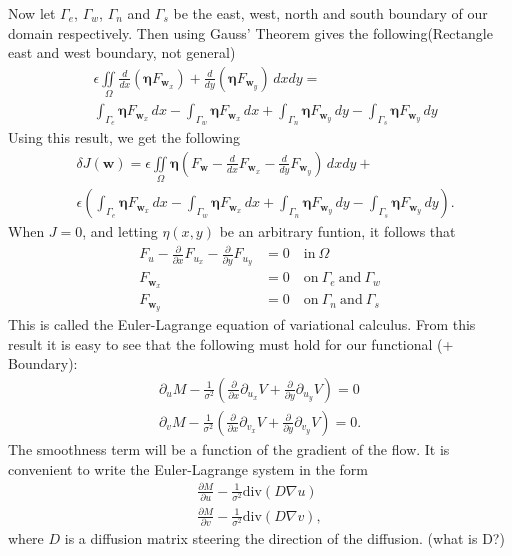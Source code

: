 \documentclass[10pt,a4paper]{article}
\begin{document}
Now let $\Gamma_{e}$, $\Gamma_{w}$, $\Gamma_{n}$ and $\Gamma_{s}$ be the east, west, north and south boundary of our domain respectively. Then using Gauss' Theorem gives the following(Rectangle east and west boundary, not general)
\begin{align*}
&\epsilon \iint \limits_{\Omega}  \frac{d}{d x} (\bm{\eta} F_{\textbf{w}_x}) + \frac{d }{d y} (\bm{\eta} F_{\textbf{w}_y}) \, dxdy = \\ &\int_{\Gamma_{e}} \bm{\eta} F_{\textbf{w}_x} \, dx - \int_{\Gamma_{w}} \bm{\eta} F_{\textbf{w}_x} \, dx + \int_{\Gamma_{n}} \bm{\eta} F_{\textbf{w}_y} \, dy - \int_{\Gamma_{s}} \bm{\eta} F_{\textbf{w}_y} \, dy
\end{align*}
Using this result, we get the following
\begin{align*}
&\delta J(\textbf{w}) = \epsilon \iint \limits_{\Omega} \bm{\eta} \left( F_\textbf{w} -  \frac{d}{d x} F_{\textbf{w}_x} - \frac{d }{d y} F_{\textbf{w}_y} \right) \, dxdy + \\ &\epsilon \left( \int_{\Gamma_{e}} \bm{\eta} F_{\textbf{w}_x} \, dx - \int_{\Gamma_{w}} \bm{\eta} F_{\textbf{w}_x} \, dx + \int_{\Gamma_{n}} \bm{\eta} F_{\textbf{w}_y} \, dy - \int_{\Gamma_{s}} \bm{\eta} F_{\textbf{w}_y} \, dy \right).
\end{align*}
When $J = 0$, and letting $\eta(x,y)$ be an arbitrary funtion, it follows that
\begin{align*}
F_u - \frac{\partial}{\partial x} F_{u_x} - \frac{\partial }{\partial y} F_{u_y} &= 0 \quad \text{in} \ \Omega \\
F_{\textbf{w}_x} &= 0 \quad \text{on} \ \Gamma_e \ \text{and} \ \Gamma_w \\
F_{\textbf{w}_y}& = 0 \quad \text{on} \ \Gamma_n \ \text{and} \ \Gamma_s
\end{align*}
This is called the Euler-Lagrange equation of variational calculus. From this result it is easy to see that the following must hold for our functional (+ Boundary):
\begin{equation}
\label{EL}
  \begin{aligned}
\partial_u M - \frac{1}{\sigma^2}\left( \frac{\partial}{\partial x} \partial_{u_x} V + \frac{\partial}{\partial y} \partial_{u_y} V \right) = 0 \\
\partial_v M- \frac{1}{\sigma^2} \left(\frac{\partial}{\partial x} \partial_{v_x} V + \frac{\partial}{\partial y} \partial_{v_y} V \right) = 0.
  \end{aligned}
\end{equation}
The smoothness term will be a function of the gradient of the flow. It is convenient to write the Euler-Lagrange system in the form
\begin{equation}
\label{EL_regu}
  \begin{aligned}
\frac{\partial M}{\partial u} - \frac{1}{\sigma^2} \text{div} \left(D \nabla u \right) \\
\frac{\partial M}{\partial v} - \frac{1}{\sigma^2} \text{div} \left(D \nabla v \right),
  \end{aligned}
\end{equation}
where $D$ is a diffusion matrix steering the direction of the diffusion. (what is D?)
\end{document}
